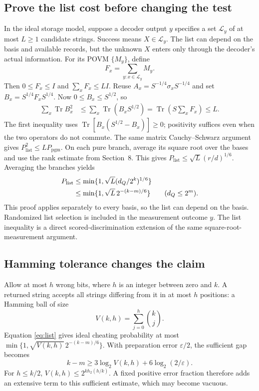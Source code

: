 \documentclass[11pt,a4paper]{article}
\newcommand{\Tr}{\operatorname{Tr}}
\newcommand{\pgm}{P_{\mathrm{pgm}}}
\begin{document}
\subsection{Prove the list cost before changing the test}
In the ideal storage model, suppose a decoder output $y$ specifies a set $\mathcal L_y$ of at most $L\geq1$ candidate strings. Success means $X\in\mathcal L_y$. The list can depend on the basis and available records, but the unknown $X$ enters only through the decoder's actual information. For its POVM $\{M_y\}$, define
\[
F_x=\sum_{y:x\in\mathcal L_y}M_y.
\]
Then $0\leq F_x\leq I$ and $\sum_xF_x\leq LI$. Reuse $A_x=S^{-1/4}\sigma_xS^{-1/4}$ and set $B_x=S^{1/4}F_xS^{1/4}$. Now $0\leq B_x\leq S^{1/2}$, so
\begin{align*}
\sum_x\Tr B_x^2
&\leq\sum_x\Tr(B_xS^{1/2})
=\Tr\left(S\sum_xF_x\right)\leq L.
\end{align*}
The first inequality uses $\Tr[B_x(S^{1/2}-B_x)]\geq0$; positivity suffices even when the two operators do not commute. The same matrix Cauchy--Schwarz argument gives $P_{\mathrm{list}}^2\leq L\pgm$. On each pure branch, average its square root over the bases and use the rank estimate from Section~8. This gives $P_{\mathrm{list}}\leq\sqrt L(r/d)^{1/6}$. Averaging the branches yields
\begin{align}\label{eq:list}
P_{\mathrm{list}}&\leq\min\{1,\sqrt L(d_Q/2^k)^{1/6}\}\notag\\
&\leq\min\{1,\sqrt L\,2^{-(k-m)/6}\}\qquad(d_Q\leq2^m).
\end{align}
This proof applies separately to every basis, so the list can depend on the basis. Randomized list selection is included in the measurement outcome $y$. The list inequality is a direct scored-discrimination extension of the same square-root-measurement argument.

\subsection{Hamming tolerance changes the claim}
Allow at most $h$ wrong bits, where $h$ is an integer between zero and $k$. A returned string accepts all strings differing from it in at most $h$ positions: a Hamming ball of size
\[
V(k,h)=\sum_{j=0}^{h}\binom{k}{j}.
\]
Equation \eqref{eq:list} gives ideal cheating probability at most
$\min\{1,\sqrt{V(k,h)}\,2^{-(k-m)/6}\}$. With preparation error $\varepsilon/2$, the sufficient gap becomes
\[
k-m\geq3\log_2 V(k,h)+6\log_2(2/\varepsilon).
\]
For $h\leq k/2$, $V(k,h)\leq2^{k h_2(h/k)}$. A fixed positive error fraction therefore adds an extensive term to this sufficient estimate, which may become vacuous.
\end{document}
